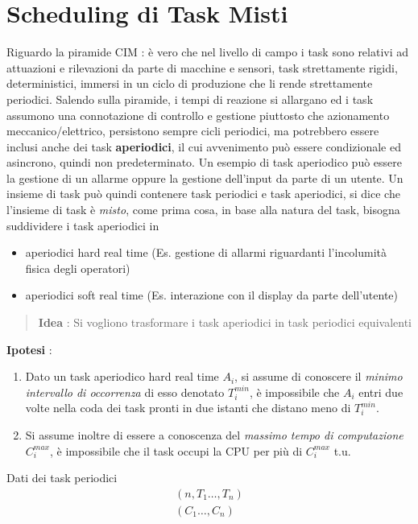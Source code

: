 \documentclass[10pt, letterpaper]{report}
\begin{document}
\section{Scheduling di Task Misti}
Riguardo la piramide CIM : è vero che nel livello di campo i task sono relativi ad attuazioni e rilevazioni da 
parte di macchine e sensori, task strettamente rigidi, deterministici, immersi in un ciclo di 
produzione che li rende strettamente periodici.\acc 
Salendo sulla piramide, i tempi di reazione si allargano ed i task assumono una 
connotazione di controllo e gestione piuttosto che azionamento meccanico/elettrico, 
persistono sempre cicli periodici, ma potrebbero essere inclusi anche dei task 
\textbf{aperiodici}, il cui avvenimento può essere condizionale ed asincrono, quindi 
non predeterminato. Un esempio di task aperiodico può essere la gestione di un 
allarme oppure la gestione dell'input da parte di un utente.\acc 
Un insieme di task può quindi contenere task periodici e task aperiodici, si dice che 
l'insieme di task è \textit{misto}, come prima cosa, in base alla natura del task, bisogna suddividere 
i task aperiodici in \begin{itemize}
    \item aperiodici hard real  time (Es. gestione di allarmi riguardanti l'incolumità fisica degli operatori)
    \item aperiodici soft real  time (Es. interazione con il display da parte dell'utente)
\end{itemize}\begin{quote}
    \textbf{Idea} : Si vogliono trasformare i task aperiodici in task periodici equivalenti
\end{quote}
\textbf{Ipotesi} :
\begin{enumerate}
    \item Dato un task aperiodico hard real time $A_i$, si assume di conoscere il \textit{minimo intervallo di 
    occorrenza} di esso denotato $T_i^{min}$, è impossibile che $A_i$ entri due volte nella coda 
    dei task pronti in due istanti che distano meno di $T_i^{min}$. 
    \item Si assume inoltre di essere a conoscenza del \textit{massimo tempo di computazione} $C_i^{max}$, è 
     impossibile che il task occupi la CPU per più di $C_i^{max}$ t.u.
\end{enumerate}
Dati dei task periodici 
$$ \begin{matrix}(n,T_1\dots ,T_n)\\
    (C_1\dots ,C_n)
\end{matrix}$$
\end{document}
